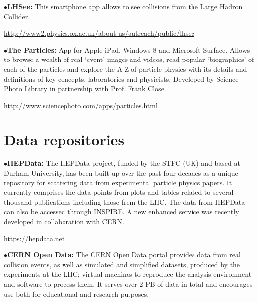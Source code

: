 \medskip

\item{$\bullet$}{\bf LHSee:}
This smartphone app allows to see collisions from the Large Hadron Collider.
	\item{}\qquad\url{http://www2.physics.ox.ac.uk/about-us/outreach/public/lhsee}

\medskip

\item{$\bullet$}{\bf The Particles:}
App for Apple iPad, Windows 8 and Microsoft Surface. Allows to browse a wealth of real ‘event’ images and videos, read popular ‘biographies’ of each of the particles and explore the A-Z of particle physics with its details and definitions of key concepts, laboratories and physicists. Developed by Science Photo Library in partnership with Prof. Frank Close.
	\item{}\qquad\url{http://www.sciencephoto.com/apps/particles.html}


\section{Data repositories}  %

\medskip


\medskip

\item{$\bullet$}{\bf HEPData:}
The HEPData project, funded by the STFC (UK) and based at Durham University, has been built up over the past four decades as a unique repository for scattering data from experimental particle physics papers.
It currently comprises the data points from plots and tables related to several thousand publications including those from the LHC.
The data from HEPData can also be accessed through INSPIRE. A new enhanced service was recently developed in collaboration with CERN.
	\item{}\qquad\url{https://hepdata.net}
\medskip

\item{$\bullet$}{\bf CERN Open Data:}
The CERN Open Data portal provides data from real collision events, as well as simulated and simplified datasets, produced by the experiments at the LHC; virtual machines to reproduce the analysis environment and software to process them. It serves over 2 PB of data in total and encourages use both for educational and research purposes.

